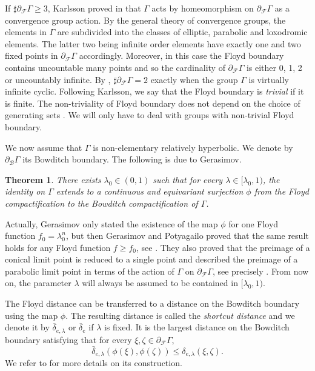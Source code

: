 \documentclass{amsart}
\newtheorem{thm}{Theorem}[section]
\theoremstyle{definition}
\theoremstyle{remark}
\begin{document}
If $\sharp \partial_{\mathcal{F}}\Gamma\ge 3$, Karlsson proved in \cite{Karlssonfreesubgroups}  that $\Gamma$ acts  by homeomorphism on $\partial_{\mathcal{F}}\Gamma$ as a convergence group action. By the general theory of convergence groups,   the elements in $\Gamma$ are subdivided into the classes of elliptic, parabolic and loxodromic elements. The latter two   being   infinite order  elements have exactly one and two fixed points in $\partial_{\mathcal{F}}\Gamma$ accordingly.
Moreover,  in this case the Floyd boundary contains uncountable many points and so the cardinality of $\partial_{\mathcal{F}}\Gamma$ is either 0, 1, 2 or uncountably infinite. By   \cite[Proposition~7]{Karlssonfreesubgroups}, $\sharp \partial_{\mathcal{F}}\Gamma= 2$ exactly when the group $\Gamma$ is virtually infinite cyclic.
Following Karlsson, we say that the Floyd boundary is \textit{trivial} if it is finite. The non-triviality of Floyd boundary does not depend on the choice of generating sets \cite[Lemma~7.1]{Yanggrowthtightness}.
We will only have to deal with groups with non-trivial Floyd boundary.


\medskip
We now assume that $\Gamma$ is non-elementary relatively hyperbolic.
We denote by $\partial_{\mathcal{B}}\Gamma$ its Bowditch boundary.
The following is due to Gerasimov.
\begin{thm}\label{mapGerasimov}\cite[Map Theorem]{Gerasimov}
There exists $\lambda_0\in (0,1)$ such that for every $\lambda\in[\lambda_0,1)$, the identity on $\Gamma$ extends to a continuous and equivariant surjection $\phi$ from the Floyd compactification to the Bowditch compactification of $\Gamma$.
\end{thm}

Actually, Gerasimov only stated the existence of the map $\phi$ for one Floyd function $f_0=\lambda_0^n$, but then
Gerasimov and Potyagailo proved that the same result holds for any Floyd function $f\geq f_0$, see \cite[Corollary~2.8]{GePoJEMS}.
They also proved that the preimage of a conical limit point is reduced to a single point and described the preimage of a parabolic limit point in terms of the action of $\Gamma$ on $\partial_{\mathcal{F}}\Gamma$, see precisely \cite[Theorem~A]{GePoJEMS}.
From now on, the parameter $\lambda$ will always be assumed to be contained in $[\lambda_0,1)$.


The Floyd distance can be transferred to a distance on the Bowditch boundary using the map $\phi$.
The resulting distance is called the \textit{ shortcut distance} and we denote it by $\overline{\delta}_{e,\lambda}$ or $\overline{\delta}_e$ if $\lambda$ is fixed.
It is the largest distance on the Bowditch boundary satisfying that for every $\xi ,\zeta\in \partial_\mathcal{F}\Gamma$,
\begin{equation}\label{shortcutsmallerFloyd}
    \bar{\delta}_{e,\lambda}(\phi(\xi),\phi(\zeta))\leq \delta_{e,\lambda}(\xi,\zeta).
\end{equation}
We refer to \cite[Section~4]{GePoGGD} for more details on its construction.
\end{document}
